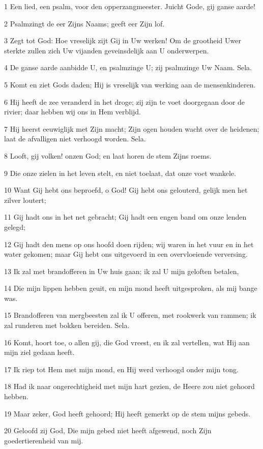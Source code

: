 \par 1 Een lied, een psalm, voor den opperzangmeester. Juicht Gode, gij ganse aarde!
\par 2 Psalmzingt de eer Zijns Naams; geeft eer Zijn lof.
\par 3 Zegt tot God: Hoe vreselijk zijt Gij in Uw werken! Om de grootheid Uwer sterkte zullen zich Uw vijanden geveinsdelijk aan U onderwerpen.
\par 4 De ganse aarde aanbidde U, en psalmzinge U; zij psalmzinge Uw Naam. Sela.
\par 5 Komt en ziet Gods daden; Hij is vreselijk van werking aan de mensenkinderen.
\par 6 Hij heeft de zee veranderd in het droge; zij zijn te voet doorgegaan door de rivier; daar hebben wij ons in Hem verblijd.
\par 7 Hij heerst eeuwiglijk met Zijn macht; Zijn ogen houden wacht over de heidenen; laat de afvalligen niet verhoogd worden. Sela.
\par 8 Looft, gij volken! onzen God; en laat horen de stem Zijns roems.
\par 9 Die onze zielen in het leven stelt, en niet toelaat, dat onze voet wankele.
\par 10 Want Gij hebt ons beproefd, o God! Gij hebt ons gelouterd, gelijk men het zilver loutert;
\par 11 Gij hadt ons in het net gebracht; Gij hadt een engen band om onze lenden gelegd;
\par 12 Gij hadt den mens op ons hoofd doen rijden; wij waren in het vuur en in het water gekomen; maar Gij hebt ons uitgevoerd in een overvloeiende verversing.
\par 13 Ik zal met brandofferen in Uw huis gaan; ik zal U mijn geloften betalen,
\par 14 Die mijn lippen hebben geuit, en mijn mond heeft uitgesproken, als mij bange was.
\par 15 Brandofferen van mergbeesten zal ik U offeren, met rookwerk van rammen; ik zal runderen met bokken bereiden. Sela.
\par 16 Komt, hoort toe, o allen gij, die God vreest, en ik zal vertellen, wat Hij aan mijn ziel gedaan heeft.
\par 17 Ik riep tot Hem met mijn mond, en Hij werd verhoogd onder mijn tong.
\par 18 Had ik naar ongerechtigheid met mijn hart gezien, de Heere zou niet gehoord hebben.
\par 19 Maar zeker, God heeft gehoord; Hij heeft gemerkt op de stem mijns gebeds.
\par 20 Geloofd zij God, Die mijn gebed niet heeft afgewend, noch Zijn goedertierenheid van mij.


